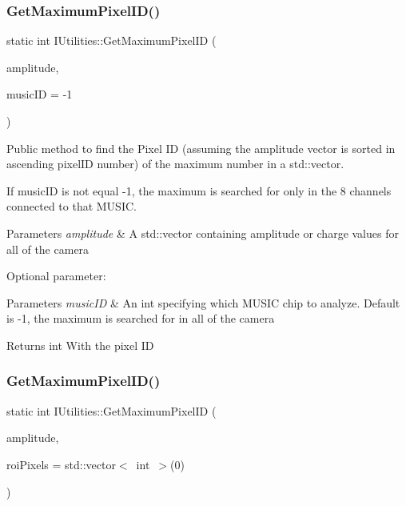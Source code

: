\subsubsection{\texorpdfstring{Get\+Maximum\+Pixel\+I\+D()}{GetMaximumPixelID()}\hspace{0.1cm}{\footnotesize\ttfamily [1/2]}}
{\footnotesize\ttfamily static int I\+Utilities\+::\+Get\+Maximum\+Pixel\+ID (\begin{DoxyParamCaption}\item[{std\+::vector$<$ float $>$}]{amplitude,  }\item[{int}]{music\+ID = {\ttfamily -\/1} }\end{DoxyParamCaption})\hspace{0.3cm}{\ttfamily [static]}}



Public method to find the Pixel ID (assuming the amplitude vector is sorted in ascending pixel\+ID number) of the maximum number in a std\+::vector. 

If music\+ID is not equal -\/1, the maximum is searched for only in the 8 channels connected to that M\+U\+S\+IC.


\begin{DoxyParams}{Parameters}
{\em amplitude} & A std\+::vector containing amplitude or charge values for all of the camera\\
\hline
\end{DoxyParams}
Optional parameter\+: 
\begin{DoxyParams}{Parameters}
{\em music\+ID} & An int specifying which M\+U\+S\+IC chip to analyze. Default is -\/1, the maximum is searched for in all of the camera\\
\hline
\end{DoxyParams}
\begin{DoxyReturn}{Returns}
int With the pixel ID 
\end{DoxyReturn}
\mbox{\label{classIUtilities_aa5cc1c99b228caf689176928478995cd}} 
\subsubsection{\texorpdfstring{Get\+Maximum\+Pixel\+I\+D()}{GetMaximumPixelID()}\hspace{0.1cm}{\footnotesize\ttfamily [2/2]}}
{\footnotesize\ttfamily static int I\+Utilities\+::\+Get\+Maximum\+Pixel\+ID (\begin{DoxyParamCaption}\item[{std\+::vector$<$ float $>$}]{amplitude,  }\item[{std\+::vector$<$ int $>$}]{roi\+Pixels = {\ttfamily std\+:\+:vector$<$~int~$>$(0)} }\end{DoxyParamCaption})\hspace{0.3cm}{\ttfamily [static]}}



